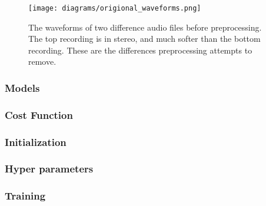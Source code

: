 \documentclass[a4paper,11pt,notitlepage]{article}
\begin{document}

\begin{figure}[H]
	\centering
	\vspace{0.5cm}
	\texttt{[image: diagrams/origional\_waveforms.png]}
	\caption{The waveforms of two difference audio files before preprocessing. The top recording is in stereo, and much softer than the bottom recording. These are the differences preprocessing attempts to remove.}
	\label{before_preprocessing}
\end{figure}

\subsubsection{Models}



\subsubsection{Cost Function}


\subsubsection{Initialization}


\subsubsection{Hyper parameters}


\subsubsection{Training}

\end{document}
